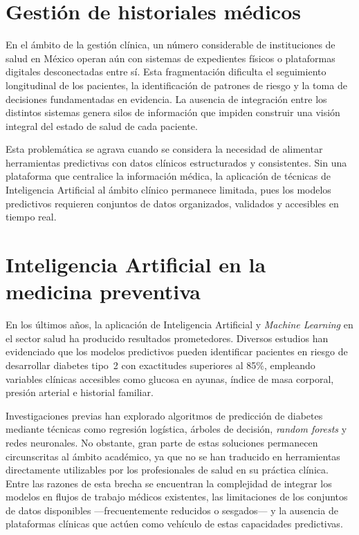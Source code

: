 \documentclass[12pt, letterpaper, twoside]{report}
\begin{document}
\section{Gestión de historiales médicos}

En el ámbito de la gestión clínica, un número considerable de instituciones de salud en México operan aún con sistemas de expedientes físicos o plataformas digitales desconectadas entre sí. Esta fragmentación dificulta el seguimiento longitudinal de los pacientes, la identificación de patrones de riesgo y la toma de decisiones fundamentadas en evidencia. La ausencia de integración entre los distintos sistemas genera silos de información que impiden construir una visión integral del estado de salud de cada paciente.

Esta problemática se agrava cuando se considera la necesidad de alimentar herramientas predictivas con datos clínicos estructurados y consistentes. Sin una plataforma que centralice la información médica, la aplicación de técnicas de Inteligencia Artificial al ámbito clínico permanece limitada, pues los modelos predictivos requieren conjuntos de datos organizados, validados y accesibles en tiempo real.

\section{Inteligencia Artificial en la medicina preventiva}

En los últimos años, la aplicación de Inteligencia Artificial y \textit{Machine Learning} en el sector salud ha producido resultados prometedores. Diversos estudios han evidenciado que los modelos predictivos pueden identificar pacientes en riesgo de desarrollar diabetes tipo~2 con exactitudes superiores al 85\%, empleando variables clínicas accesibles como glucosa en ayunas, índice de masa corporal, presión arterial e historial familiar.

Investigaciones previas han explorado algoritmos de predicción de diabetes mediante técnicas como regresión logística, árboles de decisión, \textit{random forests} y redes neuronales. No obstante, gran parte de estas soluciones permanecen circunscritas al ámbito académico, ya que no se han traducido en herramientas directamente utilizables por los profesionales de salud en su práctica clínica. Entre las razones de esta brecha se encuentran la complejidad de integrar los modelos en flujos de trabajo médicos existentes, las limitaciones de los conjuntos de datos disponibles ---frecuentemente reducidos o sesgados--- y la ausencia de plataformas clínicas que actúen como vehículo de estas capacidades predictivas.
\end{document}
